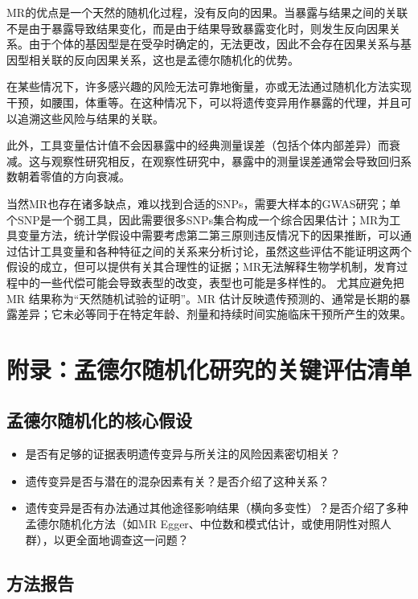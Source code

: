 \documentclass[
  chinese-hans,
  letterpaper,
  DIV=11,
  numbers=noendperiod]{scrreprt}
\providecommand{\tightlist}{%
  \setlength{\itemsep}{0pt}\setlength{\parskip}{0pt}}
\begin{document}
MR的优点是一个天然的随机化过程，没有反向的因果。当暴露与结果之间的关联不是由于暴露导致结果变化，而是由于结果导致暴露变化时，则发生反向因果关系。由于个体的基因型是在受孕时确定的，无法更改，因此不会存在因果关系与基因型相关联的反向因果关系，这也是孟德尔随机化的优势。

在某些情况下，许多感兴趣的风险无法可靠地衡量，亦或无法通过随机化方法实现干预，如腰围，体重等。在这种情况下，可以将遗传变异用作暴露的代理，并且可以追溯这些风险与结果的关联。

此外，工具变量估计值不会因暴露中的经典测量误差（包括个体内部差异）而衰减。这与观察性研究相反，在观察性研究中，暴露中的测量误差通常会导致回归系数朝着零值的方向衰减。

当然MR也存在诸多缺点，难以找到合适的SNPs，需要大样本的GWAS研究；单个SNP是一个弱工具，因此需要很多SNPs集合构成一个综合因果估计；MR为工具变量方法，统计学假设中需要考虑第二第三原则违反情况下的因果推断，可以通过估计工具变量和各种特征之间的关系来分析讨论，虽然这些评估不能证明这两个假设的成立，但可以提供有关其合理性的证据；MR无法解释生物学机制，发育过程中的一些代偿可能会导致表型的改变，表型也可能是多样性的。
尤其应避免把 MR 结果称为``天然随机试验的证明''。MR
估计反映遗传预测的、通常是长期的暴露差异；它未必等同于在特定年龄、剂量和持续时间实施临床干预所产生的效果。

\section{附录：孟德尔随机化研究的关键评估清单}\label{ux9644ux5f55ux5b5fux5fb7ux5c14ux968fux673aux5316ux7814ux7a76ux7684ux5173ux952eux8bc4ux4f30ux6e05ux5355}

\subsection{孟德尔随机化的核心假设}\label{ux5b5fux5fb7ux5c14ux968fux673aux5316ux7684ux6838ux5fc3ux5047ux8bbe}

\begin{itemize}
\tightlist
\item
  是否有足够的证据表明遗传变异与所关注的风险因素密切相关？
\item
  遗传变异是否与潜在的混杂因素有关？是否介绍了这种关系？
\item
  遗传变异是否有办法通过其他途径影响结果（横向多变性）？是否介绍了多种孟德尔随机化方法（如MR
  Egger、中位数和模式估计，或使用阴性对照人群），以更全面地调查这一问题？
\end{itemize}

\subsection{方法报告}\label{ux65b9ux6cd5ux62a5ux544a}
\end{document}
